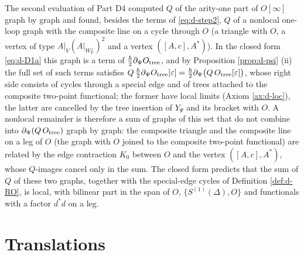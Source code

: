 \begin{remark}
\label{rem:d-Y1a}
The second evaluation of Part D4 computed $Q$ of the arity-one part of $O[\infty]$ graph by graph and found, besides the terms of \eqref{eq:d-step2}, $Q$ of a nonlocal one-loop graph with the composite line on a cycle through $O$ (a triangle with $O$, a vertex of type $A|_V(A|_{W_{\mathbb R}^\perp})^2$ and a vertex $([A,c],A^*)$). In the closed form \eqref{eq:d-D1a} this graph is a term of $\tfrac\hbar2\partial_\Psi O_{\rm tree}$, and by Proposition \ref{prop:d-psi} (ii) the full set of such terms satisfies $Q\,\tfrac\hbar2\partial_\Psi O_{\rm tree}[\varepsilon]=\tfrac\hbar2\partial_\Psi\big(Q\,O_{\rm tree}[\varepsilon]\big)$, whose right side consists of cycles through a special edge and of trees attached to the composite two-point functional; the former have local limits (Axiom \ref{ax:d-loc}), the latter are cancelled by the tree insertion of $Y_\Psi$ and its bracket with $O$. A nonlocal remainder is therefore a sum of graphs of this set that do not combine into $\partial_\Psi(Q\,O_{\rm tree})$ graph by graph: the composite triangle and the composite line on a leg of $O$ (the graph with $O$ joined to the composite two-point functional) are related by the edge contraction $K_0$ between $O$ and the vertex $([A,c],A^*)$, whose $Q$-images cancel only in the sum. The closed form predicts that the sum of $Q$ of these two graphs, together with the special-edge cycles of Definition \ref{def:d-RO}, is local, with bilinear part in the span of $O$, $\{S^{(1)}(\Delta),O\}$ and functionals with a factor $d^*d$ on a leg.
\end{remark}

\section{Translations}

